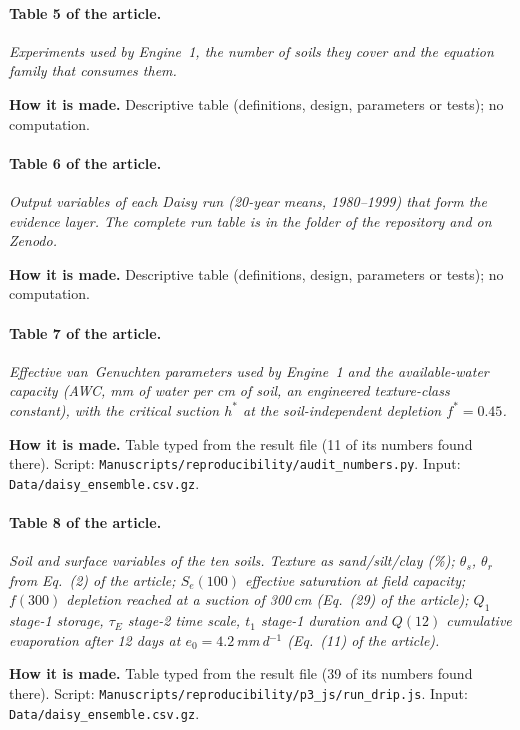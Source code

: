 \paragraph{Table 5 of the article.} \emph{Experiments used by Engine~1, the number of soils they cover and the equation family that consumes them.}

\textbf{How it is made.} Descriptive table (definitions, design, parameters or tests); no computation.

\paragraph{Table 6 of the article.} \emph{Output variables of each Daisy run (20-year means, 1980--1999) that form the evidence layer. The complete run table is in the \datalink{} folder of the repository and on Zenodo.}

\textbf{How it is made.} Descriptive table (definitions, design, parameters or tests); no computation.

\paragraph{Table 7 of the article.} \emph{Effective van~Genuchten parameters used by Engine~1 and the available-water capacity (AWC, mm of water per cm of soil, an engineered texture-class constant), with the critical suction $h^\ast$ at the soil-independent depletion $f^\ast=0.45$.}

\textbf{How it is made.} Table typed from the result file (11 of its numbers found there). Script: \nolinkurl{Manuscripts/reproducibility/audit_numbers.py}. Input: \nolinkurl{Data/daisy_ensemble.csv.gz}.

\paragraph{Table 8 of the article.} \emph{Soil and surface variables of the ten soils. Texture as sand/silt/clay (\%); $\theta_s$, $\theta_r$ from Eq.~(2) of the article; $S_e(100)$ effective saturation at field capacity; $f(300)$ depletion reached at a suction of 300\,cm (Eq.~(29) of the article); $Q_1$ stage-1 storage, $\tau_E$ stage-2 time scale, $t_1$ stage-1 duration and $Q(12)$ cumulative evaporation after 12 days at $e_0=4.2$\,mm\,d$^{-1}$ (Eq.~(11) of the article).}

\textbf{How it is made.} Table typed from the result file (39 of its numbers found there). Script: \nolinkurl{Manuscripts/reproducibility/p3_js/run_drip.js}. Input: \nolinkurl{Data/daisy_ensemble.csv.gz}.

